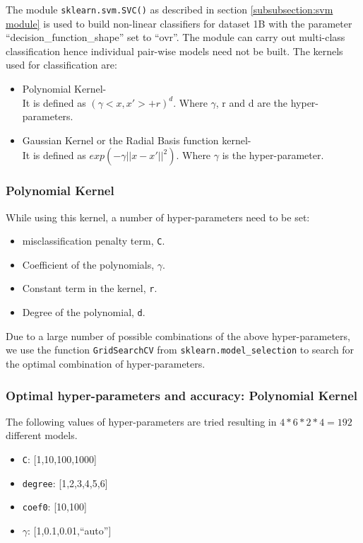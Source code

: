 \documentclass[11pt,a4paper]{article}
\newcommand{\noi}{\noindent}
\def\tt#1{\texttt{#1}}
\begin{document}
The module \tt{sklearn.svm.SVC()} as described in section \ref{subsubsection:svm module} is used to build non-linear classifiers for dataset 1B with the parameter ``decision\_function\_shape'' set to ``ovr''. The module can carry out multi-class classification hence individual pair-wise models need not be built.  
\noi
The kernels used for classification are:
\begin{itemize}
    \itemsep0em
    \item Polynomial Kernel-\\
    It is defined as $(\gamma<x,x'>+r)^d$. Where $\gamma$, r and d are the hyper-parameters.
    \item Gaussian Kernel or the Radial Basis function kernel-\\
    It is defined as $exp(-\gamma||x-x'||^2)$. Where $\gamma$ is the hyper-parameter.
\end{itemize}

\subsubsection{Polynomial Kernel}
While using this kernel, a number of hyper-parameters need to be set: 
\begin{itemize}
    \itemsep0em
    \item misclassification penalty term, \tt{C}.
    \item Coefficient of the polynomials, $\gamma$.
    \item Constant term in the kernel, \tt{r}.
    \item Degree of the polynomial, \tt{d}.
\end{itemize}

\noi
Due to a large number of possible combinations of the above hyper-parameters, we use the function \tt{GridSearchCV} from \tt{sklearn.model\_selection} to search for the optimal combination of hyper-parameters.

\subsubsection{Optimal hyper-parameters and accuracy: Polynomial Kernel}

The following values of hyper-parameters are tried resulting in $4*6*2*4=192$ different models.  
\begin{itemize}
    \itemsep0em
    \item \tt{C}: [1,10,100,1000]
    \item \tt{degree}: [1,2,3,4,5,6]
    \item \tt{coef0}: [10,100]
    \item $\gamma$: [1,0.1,0.01,``auto'']
\end{itemize}
\end{document}
